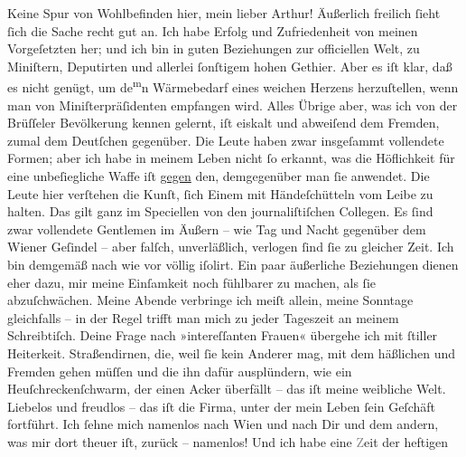 \begin{ledgroupsized}[t]{13cm}
           \pstart
           Keine Spur von Wohlbefinden hier, mein lieber Arthur! Äußerlich freilich ſieht ſich
               die Sache recht gut an. Ich habe Erfolg und Zufriedenheit von meinen Vorgeſetzten
               her; und ich bin in guten Beziehungen zur officiellen Welt, zu Miniſtern, Deputirten
               und allerlei ſonſtigem hohen Gethier. Aber es iſt klar, daß \strikeout{\textcolor{gray}{d}} es nicht genügt, um de\substVorne{}\textsuperscript{m}\substDazwischen{}n\substHinten{} Wärmebedarf eines weichen Herzens herzuſtellen, wenn man von
               Miniſterpräſidenten empfangen wird. Alles Übrige aber, was ich von der Brüſſeler Bevölkerung kennen gelernt, iſt eiskalt
               und abweiſend dem Fremden, zumal dem Deutſchen gegenüber. Die Leute haben zwar  insgeſammt vollendete Formen; aber ich habe in
               meinem Leben nicht ſo erkannt, was die Höflichkeit für eine unbeſiegliche {\pb}Waffe iſt \uline{gegen} den,
               demgegenüber man ſie anwendet. Die Leute hier verſtehen die Kunſt, ſich Einem mit
               Händeſchütteln vom  Leibe zu halten. Das gilt
               ganz im Speciellen von den journaliſtiſchen Collegen. Es ſind zwar vollendete
               Gentlemen im Äußern – wie Tag und Nacht gegenüber dem Wiener Geſindel – aber falſch, unverläßlich, verlogen ſind ſie zu gleicher
               Zeit. Ich bin demgemäß nach wie vor völlig iſolirt. Ein paar äußerliche Beziehungen
               dienen eher dazu, mir meine Einſamkeit noch fühlbarer zu machen, als ſie
               abzuſchwächen. Meine Abende verbringe ich meiſt allein, meine Sonntage gleichfalls –
               in der Regel trifft man mich zu jeder Tageszeit an meinem Schreibtiſch. Deine Frage
               nach »intereſſanten Frauen« übergehe ich mit ſtiller Heiterkeit. Straßendirnen, die,
               weil ſie kein Anderer mag, mit dem häßlichen und \label{K_L02668-4v}\label{K_L02668-4h} Fremden gehen müſſen und die ihn dafür ausplündern, wie ein
               Heuſchreckenſchwarm, der einen Acker überfällt – das iſt meine {\pb}weibliche Welt. Liebelos und freudlos – das iſt die
               Firma, unter der mein Leben ſein Geſchäft fortführt. Ich ſehne mich namenlos nach Wien und nach Dir und dem andern, was mir dort
               theuer iſt, zurück – namenlos! Und ich habe eine \textcolor{gray}{Z}eit der heftigen

\end{ledgroupsized}
